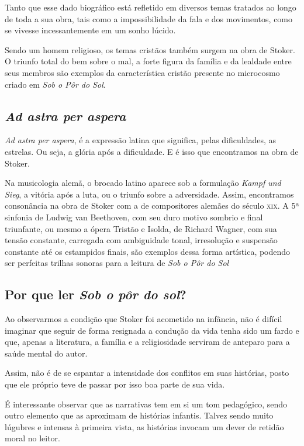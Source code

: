 \documentclass[12pt]{extarticle}
\begin{document}
Tanto que esse dado biográfico está refletido em diversos temas tratados
ao longo de toda a sua obra, tais como a impossibilidade da fala e dos
movimentos, como se vivesse incessantemente em um sonho lúcido.

Sendo um homem religioso, os temas cristãos também surgem na obra de
Stoker. O triunfo total do bem sobre o mal, a forte figura da família e
da lealdade entre seus membros são exemplos da característica cristão
presente no microcosmo criado em \emph{Sob o Pôr do Sol}.

\subsection{\textit{Ad astra per aspera}}

\emph{Ad astra per aspera}, é a expressão latina que significa, pelas
dificuldades, as estrelas. Ou seja, a glória após a dificuldade. E é
isso que encontramos na obra de Stoker.

Na musicologia alemã, o brocado latino aparece sob a formulação
\emph{Kampf und Sieg}, a vitória após a luta, ou o triunfo sobre a
adversidade. Assim, encontramos consonância na obra de Stoker com a de
compositores alemães do século \textsc{xix}. A 5ª sinfonia de Ludwig van
Beethoven, com seu duro motivo sombrio e final triunfante, ou mesmo a
ópera Tristão e Isolda, de Richard Wagner, com sua tensão constante,
carregada com ambiguidade tonal, irresolução e suspensão constante até
os estampidos finais, são exemplos dessa forma artística, podendo ser
perfeitas trilhas sonoras para a leitura de \emph{Sob o Pôr do Sol}

\subsection{Por que ler \textit{Sob o pôr do sol}?}

Ao observarmos a condição que Stoker foi acometido na infância, não é
difícil imaginar que seguir de forma resignada a condução da vida tenha
sido um fardo e que, apenas a literatura, a família e a religiosidade
serviram de anteparo para a saúde mental do autor.

Assim, não é de se espantar a intensidade dos conflitos em suas
histórias, posto que ele próprio teve de passar por isso boa parte de
sua vida.

É interessante observar que as narrativas tem em si um tom pedagógico,
sendo outro elemento que as aproximam de histórias infantis. Talvez
sendo muito lúgubres e intensas à primeira vista, as histórias invocam
um dever de retidão moral no leitor.
\end{document}
